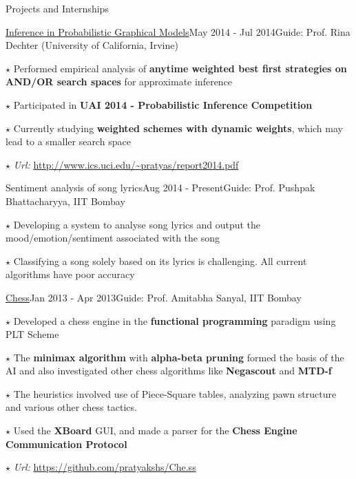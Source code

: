 \documentclass{resume2} %
\begin{document}
\begin{rSection}{Projects and Internships}

\begin{rSubsection}{\href{http://www.ics.uci.edu/~pratyas/report2014.pdf}{Inference in Probabilistic Graphical Models}}{May 2014 - Jul 2014}{Guide: Prof. Rina Dechter (University of California, Irvine)
}{}
\item[$\star$] Performed empirical analysis of \textbf{anytime weighted best first strategies on AND/OR search spaces} for approximate inference 

\item[$\star$] Participated in \textbf{UAI 2014 - Probabilistic Inference Competition}
\item[$\star$] Currently studying \textbf{weighted schemes with dynamic weights}, which may lead to a smaller search space
\item[$\star$] \emph{Url:} \url{http://www.ics.uci.edu/~pratyas/report2014.pdf}
\end{rSubsection}


\begin{rSubsection}{Sentiment analysis of song lyrics}{Aug 2014 - Present}{Guide: Prof. Pushpak Bhattacharyya, IIT Bombay}{}
\item[$\star$] Developing a system to analyse song lyrics and output the mood/emotion/sentiment associated with the song
\item[$\star$] Classifying a song solely based on its lyrics is challenging. All current algorithms have poor accuracy
\end{rSubsection}


\begin{rSubsection}{\href{https://github.com/pratyakshs/Che.ss}{Chess}}{Jan 2013 - Apr 2013}{Guide: Prof. Amitabha Sanyal, IIT Bombay}{}
\item[$\star$] Developed a chess engine in the \textbf{functional programming} paradigm using PLT Scheme
\item[$\star$] The \textbf{minimax algorithm} with \textbf{alpha-beta pruning} formed the basis of the AI and also investigated other chess algorithms like \textbf{Negascout} and \textbf{MTD-f} \item[$\star$] The heuristics involved use of Piece-Square tables, analyzing pawn structure and various other chess tactics.
\item[$\star$] Used the \textbf{XBoard} GUI, and made a parser for the \textbf{Chess Engine Communication Protocol}
\item[$\star$] \emph{Url:} \url{https://github.com/pratyakshs/Che.ss}
\end{rSubsection}





\end{rSection}
\end{document}
